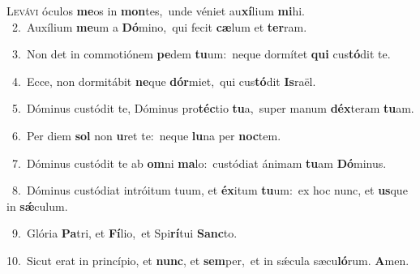 \lettrine{\initial\textcolor{\initialcolor}{L}}{evávi} óculos \textbf{me}\-os in \textbf{mon}\-tes,~\star unde véniet au\-\textbf{xí}\-lium \textbf{mi}\-hi.\\
{\numbfont\textcolor{\numbcolor}{~2.}}~Auxílium \textbf{me}\-um a \textbf{Dó}\-mino,~\star qui fecit \textbf{cæ}\-lum et \textbf{ter}\-ram.\par
{\numbfont\textcolor{\numbcolor}{~3.}}~Non det in commotiónem \textbf{pe}\-dem \textbf{tu}\-um:~\star neque dormítet \textbf{qui} cus\-\textbf{tó}\-dit te.\par
{\numbfont\textcolor{\numbcolor}{~4.}}~Ecce, non dormitábit \textbf{ne}\-que \textbf{dór}\-miet,~\star qui cus\-\textbf{tó}\-dit \textbf{Is}\-raël.\par
{\numbfont\textcolor{\numbcolor}{~5.}}~Dóminus custódit te, Dóminus pro\-\textbf{téc}\-tio \textbf{tu}\-a,~\star super manum \textbf{déx}\-teram \textbf{tu}\-am.\par
{\numbfont\textcolor{\numbcolor}{~6.}}~Per diem \textbf{sol} non \textbf{u}\-ret te:~\star neque \textbf{lu}\-na per \textbf{noc}\-tem.\par
{\numbfont\textcolor{\numbcolor}{~7.}}~Dóminus custódit te ab \textbf{om}\-ni \textbf{ma}\-lo:~\star custódiat ánimam \textbf{tu}\-am \textbf{Dó}\-minus.\par
{\numbfont\textcolor{\numbcolor}{~8.}}~Dóminus custódiat intróitum tuum, et \textbf{éx}\-itum \textbf{tu}\-um:~\star ex hoc nunc, et \textbf{us}\-que in \textbf{sǽ}\-culum.\par
{\numbfont\textcolor{\numbcolor}{~9.}}~Glória \textbf{Pa}\-tri, et \textbf{Fí}\-lio,~\star et Spi\-\textbf{rí}\-tui \textbf{Sanc}\-to.\par
{\numbfont\textcolor{\numbcolor}{10.}}~Sicut erat in princípio, et \textbf{nunc}\-, et \textbf{sem}\-per,~\star et in sǽcula sæcu\-\textbf{ló}\-rum. \textbf{A}\-men.\par
